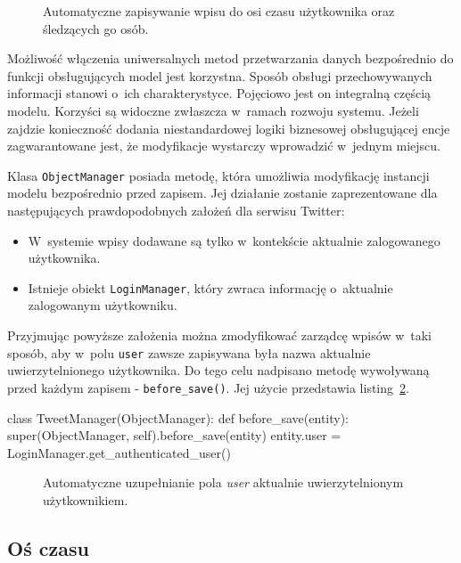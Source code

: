 \begin{figure}[ht!]
	\centering
	\theverbbox
	\caption{Automatyczne zapisywanie wpisu do osi czasu użytkownika oraz śledzących go osób.}
	\label{vrb:omc_twissandra_tweet_save}
\end{figure}

Możliwość włączenia uniwersalnych metod przetwarzania danych bezpośrednio do funkcji obsługujących model jest korzystna. Sposób obsługi przechowywanych informacji stanowi o~ich charakterystyce. Pojęciowo jest on  integralną częścią modelu. Korzyści są widoczne zwłaszcza w~ramach rozwoju systemu. Jeżeli zajdzie konieczność dodania niestandardowej logiki biznesowej obsługującej encje zagwarantowane jest, że modyfikacje wystarczy wprowadzić w~jednym miejscu.

Klasa \verb+ObjectManager+ posiada metodę, która umożliwia modyfikację instancji modelu bezpośrednio przed zapisem. Jej działanie zostanie zaprezentowane dla następujących prawdopodobnych założeń dla serwisu Twitter:

\begin{itemize}
	\item W~systemie wpisy dodawane są tylko w~kontekście aktualnie zalogowanego użytkownika.
	\item Istnieje obiekt \verb+LoginManager+, który zwraca informację o~aktualnie zalogowanym użytkowniku.
\end{itemize}

Przyjmując powyższe założenia można zmodyfikować zarządcę wpisów w~taki sposób, aby w~polu \verb+user+ zawsze zapisywana była nazwa aktualnie uwierzytelnionego użytkownika. Do tego celu nadpisano metodę wywoływaną przed każdym zapisem - \verb+before_save()+. Jej użycie przedstawia listing~\ref{vrb:omc_twissandra_tweet_pre_save}.

\begin{verbbox}
	class TweetManager(ObjectManager):
	    def before_save(entity):
	        super(ObjectManager, self).before_save(entity)
	        entity.user = LoginManager.get_authenticated_user()
\end{verbbox}

\begin{figure}[ht!]
	\centering
	\theverbbox
	\caption{Automatyczne uzupełnianie pola \emph{user} aktualnie uwierzytelnionym użytkownikiem.}
	\label{vrb:omc_twissandra_tweet_pre_save}
\end{figure}

\subsection{Oś czasu}

